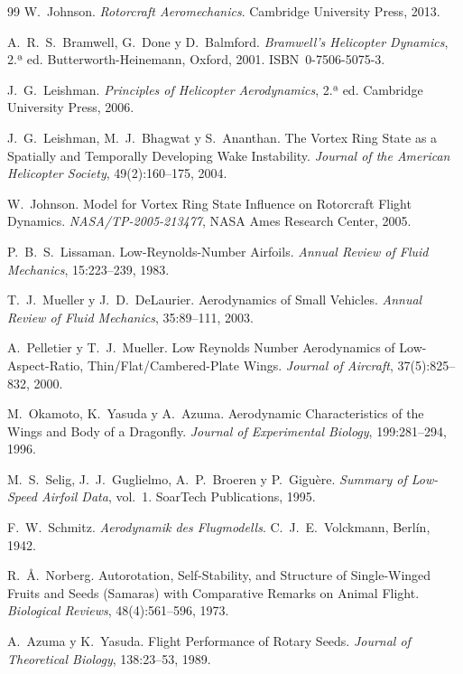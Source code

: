 \begin{thebibliography}{99}
 W.~Johnson. \emph{Rotorcraft Aeromechanics}. Cambridge University
  Press, 2013.

 A.~R.~S.~Bramwell, G.~Done y D.~Balmford. \emph{Bramwell's
  Helicopter Dynamics}, 2.ª ed. Butterworth-Heinemann, Oxford, 2001.
  ISBN~0-7506-5075-3.

 J.~G.~Leishman. \emph{Principles of Helicopter Aerodynamics},
  2.ª ed. Cambridge University Press, 2006.

 J.~G.~Leishman, M.~J.~Bhagwat y S.~Ananthan. The Vortex Ring
  State as a Spatially and Temporally Developing Wake Instability. \emph{Journal of the
  American Helicopter Society}, 49(2):160--175, 2004.

 W.~Johnson. Model for Vortex Ring State Influence on Rotorcraft
  Flight Dynamics. \emph{NASA/TP-2005-213477}, NASA Ames Research Center, 2005.

 P.~B.~S.~Lissaman. Low-Reynolds-Number Airfoils. \emph{Annual Review
  of Fluid Mechanics}, 15:223--239, 1983.

 T.~J.~Mueller y J.~D.~DeLaurier. Aerodynamics of Small Vehicles.
  \emph{Annual Review of Fluid Mechanics}, 35:89--111, 2003.

 A.~Pelletier y T.~J.~Mueller. Low Reynolds Number Aerodynamics of
  Low-Aspect-Ratio, Thin/Flat/Cambered-Plate Wings. \emph{Journal of Aircraft},
  37(5):825--832, 2000.

 M.~Okamoto, K.~Yasuda y A.~Azuma. Aerodynamic Characteristics of the
  Wings and Body of a Dragonfly. \emph{Journal of Experimental Biology}, 199:281--294, 1996.

 M.~S.~Selig, J.~J.~Guglielmo, A.~P.~Broeren y P.~Giguère.
  \emph{Summary of Low-Speed Airfoil Data}, vol.~1. SoarTech Publications, 1995.

 F.~W.~Schmitz. \emph{Aerodynamik des Flugmodells}. C.~J.~E.~Volckmann,
  Berlín, 1942.

 R.~Å.~Norberg. Autorotation, Self-Stability, and Structure of
  Single-Winged Fruits and Seeds (Samaras) with Comparative Remarks on Animal Flight.
  \emph{Biological Reviews}, 48(4):561--596, 1973.

 A.~Azuma y K.~Yasuda. Flight Performance of Rotary Seeds.
  \emph{Journal of Theoretical Biology}, 138:23--53, 1989.


\end{thebibliography}
